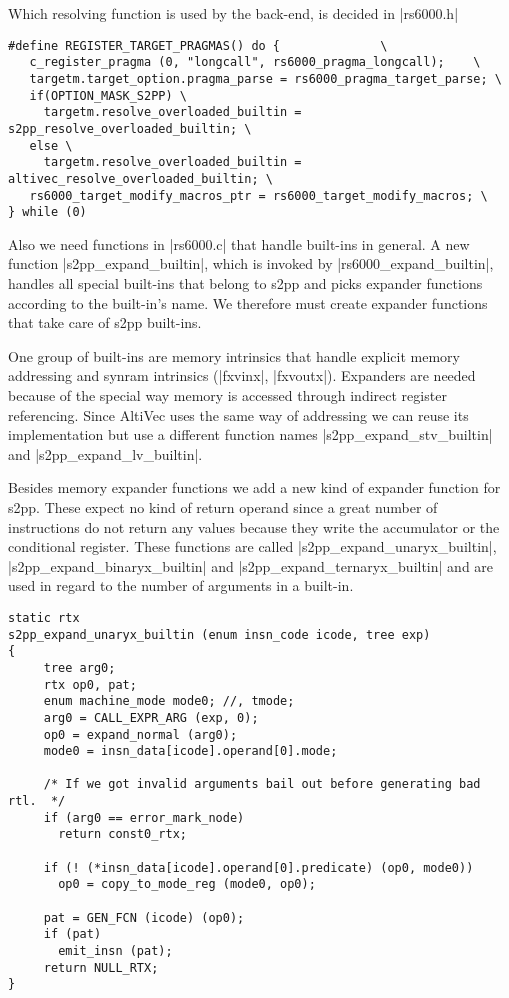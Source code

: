 Which resolving function is used by the back-end, is decided in |rs6000.h|
\begin{lstlisting}
#define REGISTER_TARGET_PRAGMAS() do {              \
   c_register_pragma (0, "longcall", rs6000_pragma_longcall);    \
   targetm.target_option.pragma_parse = rs6000_pragma_target_parse; \
   if(OPTION_MASK_S2PP) \
     targetm.resolve_overloaded_builtin = s2pp_resolve_overloaded_builtin; \
   else \
     targetm.resolve_overloaded_builtin = altivec_resolve_overloaded_builtin; \
   rs6000_target_modify_macros_ptr = rs6000_target_modify_macros; \
} while (0)
\end{lstlisting}

Also we need functions in |rs6000.c| that handle built-ins in general.
A new function |s2pp_expand_builtin|, which is invoked by |rs6000_expand_builtin|, handles all special built-ins that belong to s2pp and picks expander functions according to the built-in's name.
We therefore must create expander functions that take care of s2pp built-ins.

One group of built-ins are memory intrinsics that handle explicit memory addressing and synram intrinsics (|fxvinx|, |fxvoutx|).
Expanders are needed because of the special way memory is accessed through indirect register referencing.
Since AltiVec uses the same way of addressing we can reuse its implementation but use a different function names |s2pp_expand_stv_builtin| and |s2pp_expand_lv_builtin|.

Besides memory expander functions we add a new kind of expander function for s2pp.
These expect no kind of return operand since a great number of instructions do not return any values because they write the accumulator or the conditional register.
These functions are called |s2pp_expand_unaryx_builtin|, |s2pp_expand_binaryx_builtin| and |s2pp_expand_ternaryx_builtin| and are used in regard to the number of arguments in a built-in.
\begin{lstlisting}
static rtx
s2pp_expand_unaryx_builtin (enum insn_code icode, tree exp)
{
     tree arg0;
     rtx op0, pat;
     enum machine_mode mode0; //, tmode;
     arg0 = CALL_EXPR_ARG (exp, 0);
     op0 = expand_normal (arg0);
     mode0 = insn_data[icode].operand[0].mode;

     /* If we got invalid arguments bail out before generating bad rtl.  */
     if (arg0 == error_mark_node)
       return const0_rtx;

     if (! (*insn_data[icode].operand[0].predicate) (op0, mode0))
       op0 = copy_to_mode_reg (mode0, op0);

     pat = GEN_FCN (icode) (op0);
     if (pat)
       emit_insn (pat);
     return NULL_RTX;
}
\end{lstlisting}


